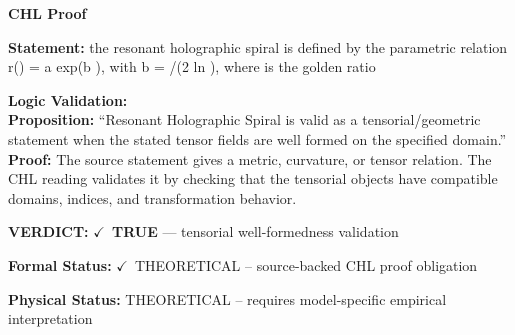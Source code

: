 \vspace{0.45em}
\noindent\textbf{CHL Proof}\par
\textbf{Statement:} the resonant holographic spiral is defined by the parametric relation r() = a exp(b
), with b = /(2 ln ), where  is the golden ratio

\textbf{Logic Validation:}\\
\textbf{Proposition:} ``Resonant Holographic Spiral is valid as a tensorial/geometric statement when the stated
tensor fields are well formed on the specified domain.''\\
\textbf{Proof:} The source statement gives a metric, curvature, or tensor relation. The CHL reading
validates it by checking that the tensorial objects have compatible domains, indices,
and transformation behavior.

\textbf{VERDICT:} \ensuremath{\checkmark}\ \textbf{TRUE} --- tensorial well-formedness validation

\textbf{Formal Status:} \ensuremath{\checkmark}\ THEORETICAL -- source-backed CHL proof obligation

\textbf{Physical Status:} THEORETICAL -- requires model-specific empirical interpretation
\par\vspace{0.45em}
\par
\ifTZPDarkEdition
{}
\fi
\endgroup
\endgroup
